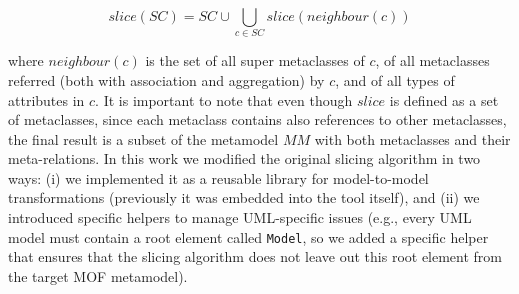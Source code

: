 \vspace{-.2cm}
$$slice(SC)=SC \cup \displaystyle\bigcup_{c \in
SC}{slice(neighbour(c))}$$
\vspace{-.2cm}

\noindent where $neighbour(c)$ is the set of all super metaclasses of
$c$, of all metaclasses referred (both with association and
aggregation) by $c$, and of all types of attributes in $c$.
It is important to note that even though $slice$ is defined
as a set of metaclasses, since each metaclass contains also references
to other metaclasses, the final result is a subset of the metamodel $MM$
with both metaclasses and their meta-relations. In this work we modified the original slicing algorithm in two ways:
(i) we implemented it as a reusable library for model-to-model transformations (previously it was embedded into
the tool itself), and (ii) we introduced specific helpers to manage UML-specific issues (e.g.,
every UML model must contain a root element called \texttt{Model}, so we added a specific helper that ensures that the slicing
algorithm does not leave out this root element from the target MOF metamodel).

